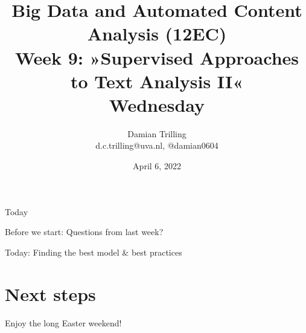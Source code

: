

\graphicspath{{../../resources/img/}}




\title[Big Data and Automated Content Analysis]{\textbf{Big Data and Automated Content Analysis (12EC)} 
\\Week 9: »Supervised Approaches to Text Analysis II«
\\Wednesday}
\author[Damian Trilling]{Damian Trilling\\ \footnotesize{d.c.trilling@uva.nl, @damian0604 \\}}
\date{April 6, 2022}


\begin{frame}{}
	\titlepage
\end{frame}

\begin{frame}{Today}
	\tableofcontents
\end{frame}


\begin{frame}[standout]
Before we start: Questions from last week?
\end{frame}


\begin{frame}[standout]
Today: Finding the best model \& best practices
\end{frame}

















\section{Next steps}

\begin{frame}[standout]
Enjoy the long Easter weekend!
\end{frame}





\begin{frame}
	\printbibliography
\end{frame}




